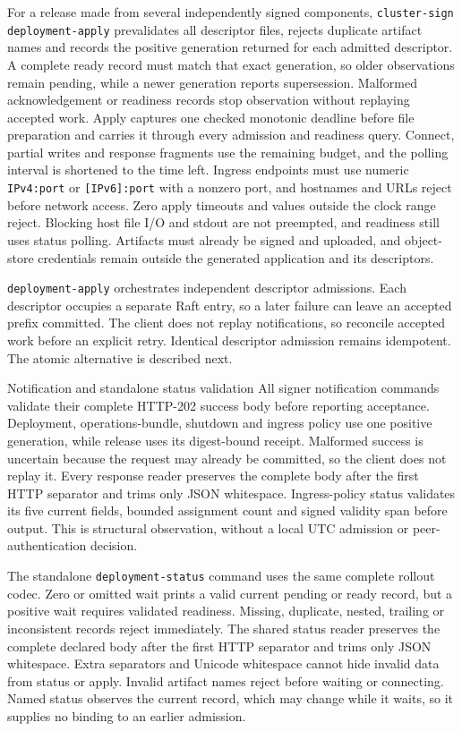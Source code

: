 For a release made from several independently signed components,
\texttt{cluster-sign deployment-apply} prevalidates all descriptor files,
rejects duplicate artifact names and records the positive generation returned
for each admitted descriptor. A complete ready record must match that exact
generation, so older observations remain pending, while a newer generation reports
supersession. Malformed acknowledgement or readiness records stop observation
without replaying accepted work. Apply captures one checked monotonic deadline
before file preparation and carries it through every admission and readiness
query. Connect, partial writes and response fragments use the remaining budget, and
the polling interval is shortened to the time left. Ingress endpoints must use
numeric \texttt{IPv4:port} or \texttt{[IPv6]:port} with a nonzero port, and hostnames
and URLs reject before network access. Zero apply timeouts and values outside the
clock range reject. Blocking host file I/O and stdout are not preempted, and
readiness still uses status polling. Artifacts must already be signed and uploaded, and object-store
credentials remain outside the generated application and its descriptors.

\texttt{deployment-apply} orchestrates independent descriptor admissions.
Each descriptor occupies a separate Raft entry, so a later failure can leave
an accepted prefix committed. The client does not replay notifications, so
reconcile accepted work before an explicit retry. Identical descriptor admission
remains idempotent. The atomic alternative is described next.

\begin{implementationdetail}{Notification and standalone status validation}
All signer notification commands validate their complete HTTP-202 success body
before reporting acceptance. Deployment, operations-bundle, shutdown and ingress
policy use one positive generation, while release uses its digest-bound receipt.
Malformed success is uncertain because the request may already be committed, so
the client does not replay it. Every response reader preserves the complete
body after the first HTTP separator and trims only JSON whitespace.
Ingress-policy status validates its five current fields, bounded assignment
count and signed validity span before output. This is structural observation,
without a local UTC admission or peer-authentication decision.

The standalone \texttt{deployment-status} command uses the same complete rollout
codec. Zero or omitted wait prints a valid current pending or ready record, but
a positive wait requires validated readiness. Missing, duplicate, nested,
trailing or inconsistent records reject immediately. The shared status reader
preserves the complete declared body after the first HTTP separator and trims
only JSON whitespace. Extra separators and Unicode whitespace cannot hide
invalid data from status or apply. Invalid artifact names reject before waiting
or connecting. Named status observes the current record, which may change while
it waits, so it supplies no binding to an earlier admission.
\end{implementationdetail}

